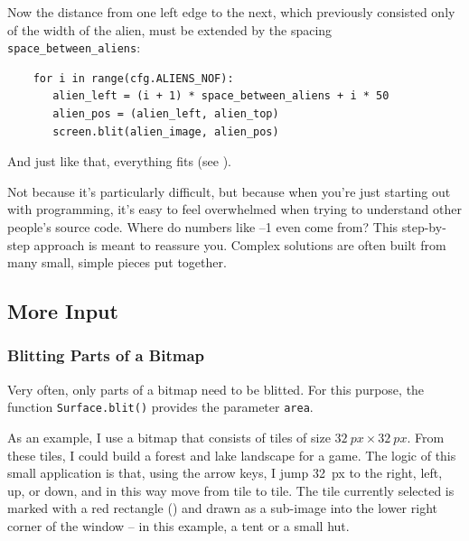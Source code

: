 Now the distance from one left edge to the next, which previously consisted only of the width of the alien, must be extended by the spacing \texttt{space\_between\_aliens}:

\lstset{firstnumber=36}
\begin{lstlisting}
	for i in range(cfg.ALIENS_NOF):
	   alien_left = (i + 1) * space_between_aliens + i * 50
	   alien_pos = (alien_left, alien_top)
	   screen.blit(alien_image, alien_pos)
\end{lstlisting} 

And just like that, everything fits (see ).


\begin{hintbox}
	Not because it’s particularly difficult, but because when you’re just starting out with programming, it’s easy to feel overwhelmed when trying to understand other people’s source code. Where do numbers like {–1} even come from? This step-by-step approach is meant to reassure you. Complex solutions are often built from many small, simple pieces put together.
\end{hintbox}


\subsection{More Input}
\subsubsection{Blitting Parts of a Bitmap}

Very often, only parts of a bitmap need to be blitted. For this purpose, the function \texttt{Surface.blit()} provides the parameter \texttt{area}.

\begin{figure}
	\vspace{-1.0em}
\end{figure}As an example, I use a bitmap that consists of tiles of size $\SI{32}{px}\times\SI{32}{px}$. From these tiles, I could build a forest and lake landscape for a game. The logic of this small application is that, using the arrow keys, I jump \SI{32}{px} to the right, left, up, or down, and in this way move from tile to tile. The tile currently selected is marked with a red rectangle () and drawn as a sub-image into the lower right corner of the window -- in this example, a tent or a small hut.


